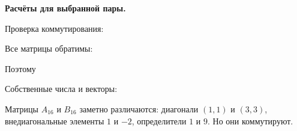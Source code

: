 \documentclass[a4paper,14pt]{extarticle}
\begin{document}
\textbf{Расчёты для выбранной пары.} \begin{center}\end{center} Проверка коммутирования: \begin{center}\end{center} Все матрицы обратимы: \begin{center}\end{center} \begin{center}\end{center} Поэтому \begin{center}\end{center} \begin{center}\end{center} Собственные числа и векторы: \begin{center}\end{center} \begin{center}\end{center} \begin{center}\end{center} Матрицы \(A_{16}\) и \(B_{16}\) заметно различаются: диагонали
\((1,1)\) и \((3,3)\), внедиагональные элементы \(1\) и \(-2\),
определители \(1\) и \(9\). Но они коммутируют.
\end{document}
